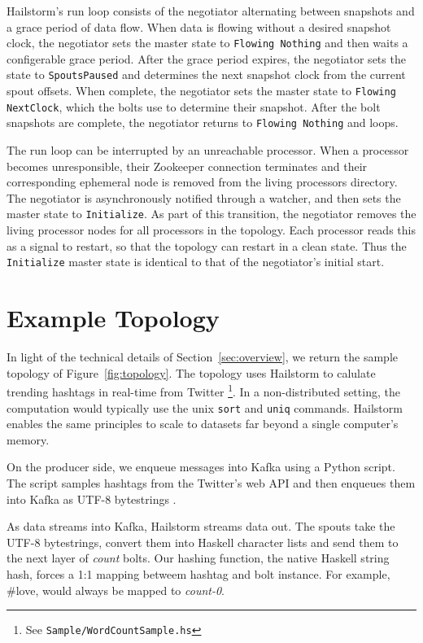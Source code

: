 \documentclass[10pt,nocopyrightspace]{sigplanconf}
\begin{document}
Hailstorm's run loop consists of the negotiator alternating between snapshots
and a grace period of data flow. When data is flowing without a desired snapshot
clock, the negotiator sets the master state to \lstinline{Flowing Nothing} and
then waits a configerable grace period. After the grace period expires, the
negotiator sets the state to \lstinline{SpoutsPaused} and determines the next
snapshot clock from the current spout offsets. When complete, the negotiator sets
the master state to \lstinline{Flowing NextClock}, which the bolts use to determine
their snapshot. After the bolt snapshots are complete, the negotiator returns to
\lstinline{Flowing Nothing} and loops.

The run loop can be interrupted by an unreachable processor. When a processor
becomes unresponsible, their Zookeeper connection terminates and their
corresponding ephemeral node is removed from the living processors directory.
The negotiator is asynchronously notified through a watcher, and then sets the
master state to \lstinline{Initialize}. As part of this transition, the negotiator
removes the living processor nodes for all processors in the topology. Each
processor reads this as a signal to restart, so that the topology can restart in
a clean state. Thus the \lstinline{Initialize} master state is identical to that of
the negotiator's initial start.

\section{Example Topology}
In light of the technical details of Section~\ref{sec:overview}, we return the
sample topology of Figure~\ref{fig:topology}. The topology uses 
Hailstorm to calulate trending hashtags in real-time from Twitter
\footnote{See \texttt{Sample/WordCountSample.hs}}. In a non-distributed setting,
the computation would typically use the unix \texttt{sort} and \texttt{uniq}
commands. Hailstorm enables the same principles to scale to datasets far beyond a
single computer's memory.

On the producer side, we enqueue messages into Kafka using a Python script. The script
samples hashtags from the Twitter's web API and then enqueues them into Kafka as 
UTF-8 bytestrings .

As data streams into Kafka, Hailstorm streams data out. The spouts
take the UTF-8 bytestrings, convert them into Haskell character lists
and send them to the next layer of \textit{count} bolts. Our hashing function, 
the native Haskell string hash, forces a 1:1 mapping betweem hashtag and bolt instance. 
For example, \#love, would always be mapped to \textit{count-0}.
\end{document}
